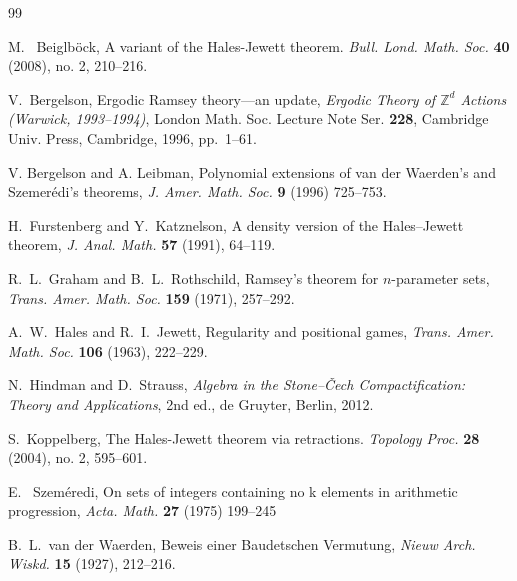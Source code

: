 \documentclass[12pt]{amsart}
\begin{document}
\begin{thebibliography}{99}

M. ~Beiglb\"{o}ck,
\newblock A variant of the Hales-Jewett theorem.
\newblock \emph{Bull. Lond. Math. Soc. 
} \textbf{40} (2008), no. 2, 210–216.

V.~Bergelson,
\newblock Ergodic Ramsey theory---an update,
\newblock \emph{Ergodic Theory of $\mathbb{Z}^d$ Actions (Warwick, 1993--1994)},
London Math. Soc. Lecture Note Ser. \textbf{228}, Cambridge Univ. Press, Cambridge, 1996, pp.~1--61.

V. Bergelson and A. Leibman, 
\newblock Polynomial extensions of van der Waerden’s and Szemer\'edi’s theorems,
\newblock \emph{J. Amer. Math. Soc.} \textbf{9} (1996) 725–753.

H.~Furstenberg and Y.~Katznelson,
\newblock A density version of the Hales--Jewett theorem,
\newblock \emph{J. Anal. Math.} \textbf{57} (1991), 64--119.

R.~L.~Graham and B.~L.~Rothschild,
\newblock Ramsey's theorem for $n$-parameter sets,
\newblock \emph{Trans. Amer. Math. Soc.} \textbf{159} (1971), 257--292.

A.~W.~Hales and R.~I.~Jewett,
\newblock Regularity and positional games,
\newblock \emph{Trans. Amer. Math. Soc.} \textbf{106} (1963), 222--229.

N.~Hindman and D.~Strauss,
\newblock \emph{Algebra in the Stone--\v{C}ech Compactification: Theory and Applications},
2nd ed., de Gruyter, Berlin, 2012.

S.~Koppelberg,
\newblock The Hales-Jewett theorem via retractions.
\newblock \emph{Topology Proc.} \textbf{28} (2004), no. 2, 595–601.

E. ~Szem\'{e}redi, 
\newblock On sets of integers containing no k elements in arithmetic progression,
\newblock \emph{Acta. Math.}  \textbf{27}
(1975) 199–245

B.~L.~van der Waerden,
\newblock Beweis einer Baudetschen Vermutung,
\newblock \emph{Nieuw Arch. Wiskd.} \textbf{15} (1927), 212--216.



\end{thebibliography}
\end{document}
